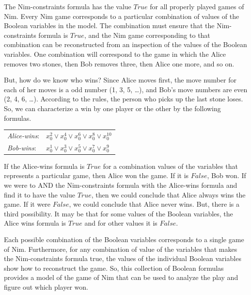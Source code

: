 {{The Nim-constraints formula has the value $True$ for all properly played games of Nim.
Every Nim game corresponds to a particular combination of values of
the Boolean variables in the model.
The combination must ensure that the Nim-constraints formula is $True$, and
the Nim game corresponding to that combination can be reconstructed
from an inspection of the values of the Boolean variables.
One combination will correspond to the game in which the Alice removes two stones,
then Bob removes three, then Alice one more, and so on.

But, how do we know who wins?
Since Alice moves first, the move number for each of her moves is a odd number (1, 3, 5, \dots),
and Bob's move numbers are even (2, 4, 6, \dots).
According to the rules, the person who picks up the last stone loses.
So, we can characterize a win by one player or the other by
the following formulas.
\begin{center}
\label{alice-wins-formula}
\begin{tabular} {ll}
\emph{Alice-wins}: & $x_{0}^{2} \vee x_{0}^{4} \vee x_{0}^{6} \vee x_{0}^{8} \vee x_{0}^{10}$ \\
\emph{Bob-wins}:   & $x_{0}^{1} \vee x_{0}^{3} \vee x_{0}^{5} \vee x_{0}^{7} \vee x_{0}^{9}$  \\
\end{tabular}
\end{center}

If the Alice-wins formula is $True$
for a combination values of the variables that represents a particular game,
then Alice won the game. If it is $False$, Bob won.
If we were to AND the Nim-constraints formula with the Alice-wins formula
and find it to have the value $True$, then we could conclude that Alice always wins the game.
If it were $False$, we could conclude that Alice never wins.
But, there is a third possibility.
It may be that for some values of the Boolean variables,
the Alice wins formula is $True$
and for other values it is $False$.

Each possible combination of the Boolean variables
corresponds to a single game of Nim.
Furthermore, for any combination of value of the variables that makes the
Nim-constraints formula true, the values of the individual Boolean variables
show how to reconstruct the game.
So, this collection of Boolean formulas provides a model of the game of Nim
that can be used to analyze the play and figure out which player won.

}}
